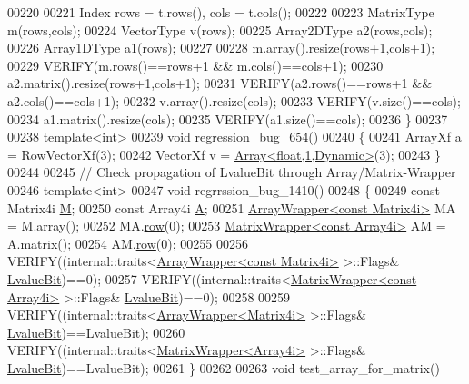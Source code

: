 \begin{DoxyCode}
00220 
00221   Index rows = t.rows(), cols = t.cols();
00222 
00223   MatrixType m(rows,cols);
00224   VectorType v(rows);
00225   Array2DType a2(rows,cols);
00226   Array1DType a1(rows);
00227 
00228   m.array().resize(rows+1,cols+1);
00229   VERIFY(m.rows()==rows+1 && m.cols()==cols+1);
00230   a2.matrix().resize(rows+1,cols+1);
00231   VERIFY(a2.rows()==rows+1 && a2.cols()==cols+1);
00232   v.array().resize(cols);
00233   VERIFY(v.size()==cols);
00234   a1.matrix().resize(cols);
00235   VERIFY(a1.size()==cols);
00236 \}
00237 
00238 \textcolor{keyword}{template}<\textcolor{keywordtype}{int}>
00239 \textcolor{keywordtype}{void} regression\_bug\_654()
00240 \{
00241   ArrayXf a = RowVectorXf(3);
00242   VectorXf v = \hyperlink{group___core___module_class_eigen_1_1_array}{Array<float,1,Dynamic>}(3);
00243 \}
00244 
00245 \textcolor{comment}{// Check propagation of LvalueBit through Array/Matrix-Wrapper}
00246 \textcolor{keyword}{template}<\textcolor{keywordtype}{int}>
00247 \textcolor{keywordtype}{void} regrrssion\_bug\_1410()
00248 \{
00249   \textcolor{keyword}{const} Matrix4i \hyperlink{group___core___module_class_eigen_1_1_matrix}{M};
00250   \textcolor{keyword}{const} Array4i \hyperlink{group___core___module_class_eigen_1_1_matrix}{A};
00251   \hyperlink{group___core___module_class_eigen_1_1_array_wrapper}{ArrayWrapper<const Matrix4i>} MA = M.array();
00252   MA.\hyperlink{group___core___module_a4ea11afe36c7962c706caa93decd1380}{row}(0);
00253   \hyperlink{group___core___module_class_eigen_1_1_matrix_wrapper}{MatrixWrapper<const Array4i>} AM = A.matrix();
00254   AM.\hyperlink{group___core___module_a4ea11afe36c7962c706caa93decd1380}{row}(0);
00255 
00256   VERIFY((internal::traits<\hyperlink{group___core___module_class_eigen_1_1_array_wrapper}{ArrayWrapper<const Matrix4i>} >::Flags&
      \hyperlink{group__flags_gae2c323957f20dfdc6cb8f44428eaec1a}{LvalueBit})==0);
00257   VERIFY((internal::traits<\hyperlink{group___core___module_class_eigen_1_1_matrix_wrapper}{MatrixWrapper<const Array4i>} >::Flags&
      \hyperlink{group__flags_gae2c323957f20dfdc6cb8f44428eaec1a}{LvalueBit})==0);
00258 
00259   VERIFY((internal::traits<\hyperlink{group___core___module_class_eigen_1_1_array_wrapper}{ArrayWrapper<Matrix4i>} >::Flags&
      \hyperlink{group__flags_gae2c323957f20dfdc6cb8f44428eaec1a}{LvalueBit})==LvalueBit);
00260   VERIFY((internal::traits<\hyperlink{group___core___module_class_eigen_1_1_matrix_wrapper}{MatrixWrapper<Array4i>} >::Flags&
      \hyperlink{group__flags_gae2c323957f20dfdc6cb8f44428eaec1a}{LvalueBit})==LvalueBit);
00261 \}
00262 
00263 \textcolor{keywordtype}{void} test\_array\_for\_matrix()

\end{DoxyCode}
